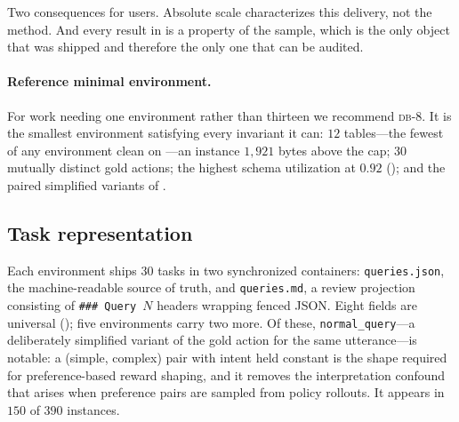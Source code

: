 \documentclass[11pt,letterpaper]{article}
\theoremstyle{definition}
\theoremstyle{plain}
\theoremstyle{remark}
\newcommand{\dbn}[1]{\textsc{db-#1}}
\newcommand{\code}[1]{\texttt{#1}}
\begin{document}
Two consequences for users. Absolute scale characterizes this delivery, not the method. And
every result in  is a property of the sample, which is the only object that
was shipped and therefore the only one that can be audited.

\paragraph{Reference minimal environment.}
For work needing one environment rather than thirteen we recommend \dbn{8}. It is the
smallest environment satisfying every invariant it can: $12$ tables---the fewest of any
environment clean on ---an instance $1{,}921$ bytes above the cap; $30$ mutually
distinct gold actions; the highest schema utilization at $0.92$ (); and
the paired simplified variants of .

\subsection{Task representation}
\label{sec:repr}

Each environment ships $30$ tasks in two synchronized containers: \code{queries.json}, the
machine-readable source of truth, and \code{queries.md}, a review projection consisting of
\code{\#\#\# Query $N$} headers wrapping fenced JSON. Eight fields are universal
(); five environments carry two more. Of these, \code{normal\_query}---a
deliberately simplified variant of the gold action for the same utterance---is notable: a
(simple, complex) pair with intent held constant is the shape required for preference-based
reward shaping, and it removes the interpretation confound that arises when preference pairs
are sampled from policy rollouts. It appears in $150$ of $390$ instances.
\end{document}
